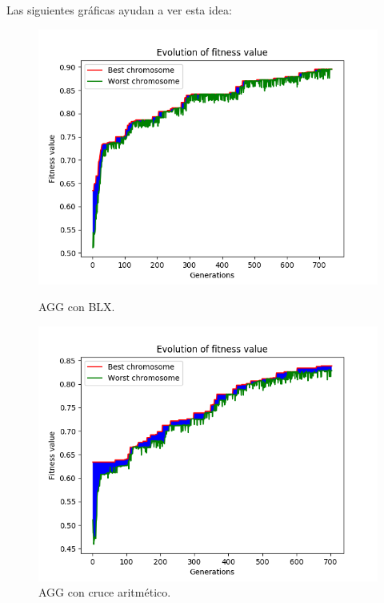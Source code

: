 \documentclass[11pt,a4paper]{article}
\begin{document}
Las siguientes gráficas ayudan a ver esta idea:

\begin{figure}[H]
\centering
\begin{minipage}{.5\textwidth}
	\centering
	\includegraphics[scale=0.43]{img/agg-blx-texture.png}
	\caption{AGG con BLX.}
\end{minipage}%
\begin{minipage}{.5\textwidth}
	\centering
	\includegraphics[scale=0.43]{img/agg-ac-texture.png}
	\caption{AGG con cruce aritmético.}
\end{minipage}
\end{figure}
\end{document}
